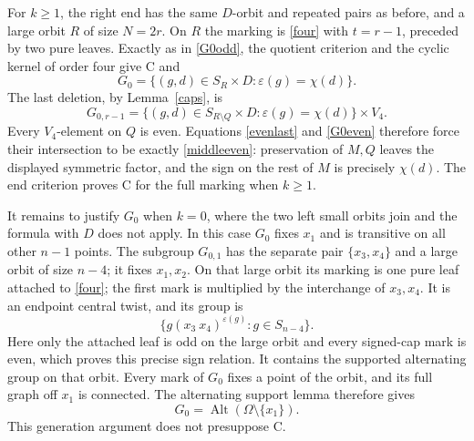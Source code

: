 \documentclass[11pt]{article}
\newcommand{\Alt}{\operatorname{Alt}}
\newcommand{\eps}{\varepsilon}
\begin{document}
For $k\ge1$, the right end has the same $D$-orbit and repeated
pairs as before, and a large orbit $R$ of size $N=2r$. On $R$
the marking is \eqref{four} with $t=r-1$, preceded by two pure
leaves. Exactly as in \eqref{G0odd}, the quotient criterion and
the cyclic kernel of order four give C and
\begin{equation}\label{G0even}
 G_0=\{(g,d)\in S_R\times D:\eps(g)=\chi(d)\}.
\end{equation}
The last deletion, by Lemma~\ref{caps}, is
\begin{equation}\label{middleeven}
 G_{0,r-1}=
 \{(g,d)\in S_{R\setminus Q}\times D:\eps(g)=\chi(d)\}
       \times V_4.
\end{equation}
Every $V_4$-element on $Q$ is even. Equations
\eqref{evenlast} and \eqref{G0even} therefore force their
intersection to be exactly \eqref{middleeven}: preservation of
$M,Q$ leaves the displayed symmetric factor, and the sign on
the rest of $M$ is precisely $\chi(d)$. The end criterion
proves C for the full marking when $k\ge1$.

It remains to justify $G_0$ when $k=0$, where the two left
small orbits join and the formula with $D$ does not apply.
In this case $G_0$ fixes $x_1$ and is transitive on all other
$n-1$ points. The subgroup $G_{0,1}$ has the separate pair
$\{x_3,x_4\}$ and a large orbit of size $n-4$; it fixes
$x_1,x_2$. On that large orbit its marking is one pure leaf
attached to \eqref{four}; the first mark is multiplied by the
interchange of $x_3,x_4$. It is an endpoint central twist, and
its group is
\begin{equation}\label{smallend}
 \{g(x_3\ x_4)^{\eps(g)}:g\in S_{n-4}\}.
\end{equation}
Here only the attached leaf is odd on the large orbit and every
signed-cap mark is even, which proves this precise sign relation.
It contains the supported alternating group on that orbit.
Every mark of $G_0$ fixes a point of the orbit, and its full
graph off $x_1$ is connected. The alternating support lemma
therefore gives
\begin{equation}\label{maxright}
 G_0=\Alt(\Omega\setminus\{x_1\}).
\end{equation}
This generation argument does not presuppose C.
\end{document}
